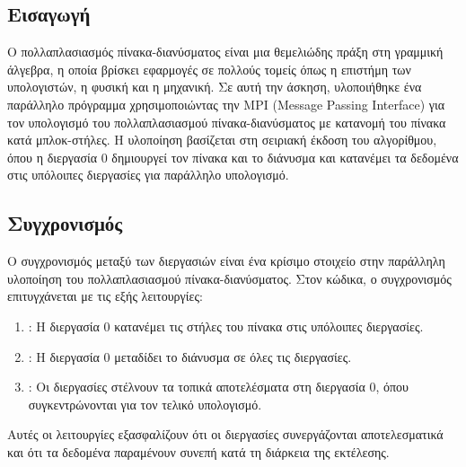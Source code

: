 \documentclass{article}
\begin{document}
\subsection*{Εισαγωγή}
Ο πολλαπλασιασμός πίνακα-διανύσματος είναι μια θεμελιώδης πράξη στη γραμμική άλγεβρα, η οποία βρίσκει εφαρμογές σε πολλούς τομείς όπως η επιστήμη των υπολογιστών, η φυσική και η μηχανική. Σε αυτή την άσκηση, υλοποιήθηκε ένα παράλληλο πρόγραμμα χρησιμοποιώντας την MPI (Message Passing Interface) για τον υπολογισμό του πολλαπλασιασμού πίνακα-διανύσματος με κατανομή του πίνακα κατά μπλοκ-στήλες. Η υλοποίηση βασίζεται στη σειριακή έκδοση του αλγορίθμου, όπου η διεργασία 0 δημιουργεί τον πίνακα και το διάνυσμα και κατανέμει τα δεδομένα στις υπόλοιπες διεργασίες για παράλληλο υπολογισμό.
\subsection*{Συγχρονισμός}
Ο συγχρονισμός μεταξύ των διεργασιών είναι ένα κρίσιμο στοιχείο στην παράλληλη υλοποίηση του πολλαπλασιασμού πίνακα-διανύσματος. Στον κώδικα, ο συγχρονισμός επιτυγχάνεται με τις εξής λειτουργίες:
\begin{enumerate}
    \item \textbf{}: Η διεργασία 0 κατανέμει τις στήλες του πίνακα στις υπόλοιπες διεργασίες.
    \item \textbf{}: Η διεργασία 0 μεταδίδει το διάνυσμα σε όλες τις διεργασίες.
    \item \textbf{}: Οι διεργασίες στέλνουν τα τοπικά αποτελέσματα στη διεργασία 0, όπου συγκεντρώνονται για τον τελικό υπολογισμό.
\end{enumerate}
Αυτές οι λειτουργίες εξασφαλίζουν ότι οι διεργασίες συνεργάζονται αποτελεσματικά και ότι τα δεδομένα παραμένουν συνεπή κατά τη διάρκεια της εκτέλεσης.
\end{document}
